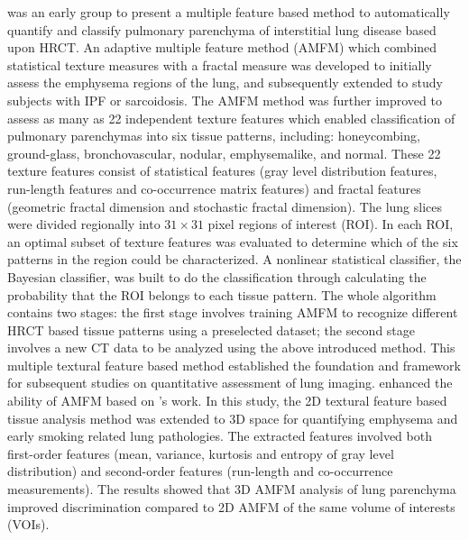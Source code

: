 \cite{uppaluri1999interstitial,uppaluri1999computer} was an early group to present a multiple feature based method to automatically quantify and classify pulmonary parenchyma of interstitial lung disease based upon HRCT. An adaptive multiple feature method (AMFM) which combined statistical texture measures with a fractal measure was developed to initially assess the emphysema regions of the lung, and subsequently extended to study subjects with IPF or sarcoidosis. The AMFM method was further improved to assess as many as 22 independent texture features which enabled classification of pulmonary parenchymas into six tissue patterns, including: honeycombing, ground-glass, bronchovascular, nodular, emphysemalike, and normal. These 22 texture features consist of statistical features (gray level distribution features, run-length features and co-occurrence matrix features) and fractal features (geometric fractal dimension and stochastic fractal dimension). The lung slices were divided regionally into $31 \times 31$ pixel regions of interest (ROI). In each ROI, an optimal subset of texture features was evaluated to determine which of the six patterns in the region could be characterized. A nonlinear statistical classifier, the Bayesian classifier, was built to do the classification through calculating the probability that the ROI belongs to each tissue pattern. The whole algorithm contains two stages: the first stage involves training AMFM to recognize different HRCT based tissue patterns using a preselected dataset; the second stage involves a new CT data to be analyzed using the above introduced method. This multiple textural feature based method established the foundation and framework for subsequent studies on quantitative assessment of lung imaging. \cite{xu2006computer,xu2006mdct} enhanced the ability of AMFM based on \cite{uppaluri1999interstitial,uppaluri1999computer}'s work. In this study, the 2D textural feature based tissue analysis method was extended to 3D space for quantifying emphysema and early smoking related lung pathologies. The extracted features involved both first-order features (mean, variance, kurtosis and entropy of gray level distribution) and second-order features (run-length and co-occurrence measurements). The results showed that 3D AMFM analysis of lung parenchyma improved discrimination compared to 2D AMFM of the same volume of interests (VOIs). 

